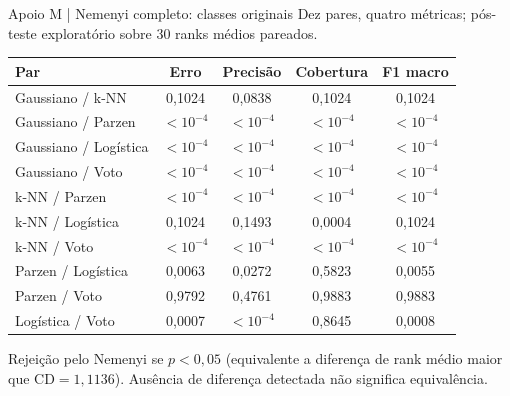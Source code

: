 \documentclass[aspectratio=169,11pt]{beamer}
\begin{document}
\begin{frame}[t]{Apoio M | Nemenyi completo: classes originais}
\scriptsize Dez pares, quatro métricas; pós-teste exploratório sobre 30 ranks médios pareados.\par\vspace{2mm}
\begin{center}
\scriptsize
\renewcommand{\arraystretch}{1.13}
\setlength{\tabcolsep}{5pt}
\begin{tabular}{lcccc}
\toprule
Par & Erro & Precisão & Cobertura & F1 macro \\
\midrule
Gaussiano / k-NN & 0,1024 & 0,0838 & 0,1024 & 0,1024 \\
Gaussiano / Parzen & $<10^{-4}$ & $<10^{-4}$ & $<10^{-4}$ & $<10^{-4}$ \\
Gaussiano / Logística & $<10^{-4}$ & $<10^{-4}$ & $<10^{-4}$ & $<10^{-4}$ \\
Gaussiano / Voto & $<10^{-4}$ & $<10^{-4}$ & $<10^{-4}$ & $<10^{-4}$ \\
k-NN / Parzen & $<10^{-4}$ & $<10^{-4}$ & $<10^{-4}$ & $<10^{-4}$ \\
k-NN / Logística & 0,1024 & 0,1493 & 0,0004 & 0,1024 \\
k-NN / Voto & $<10^{-4}$ & $<10^{-4}$ & $<10^{-4}$ & $<10^{-4}$ \\
Parzen / Logística & 0,0063 & 0,0272 & 0,5823 & 0,0055 \\
Parzen / Voto & 0,9792 & 0,4761 & 0,9883 & 0,9883 \\
Logística / Voto & 0,0007 & $<10^{-4}$ & 0,8645 & 0,0008 \\
\bottomrule
\end{tabular}
\end{center}
\vspace{2mm}
\begin{notabox}\scriptsize Rejeição pelo Nemenyi se $p<0,05$ (equivalente a diferença de rank médio maior que $\mathrm{CD}=1,1136$). Ausência de diferença detectada não significa equivalência.\end{notabox}
\end{frame}
\end{document}
